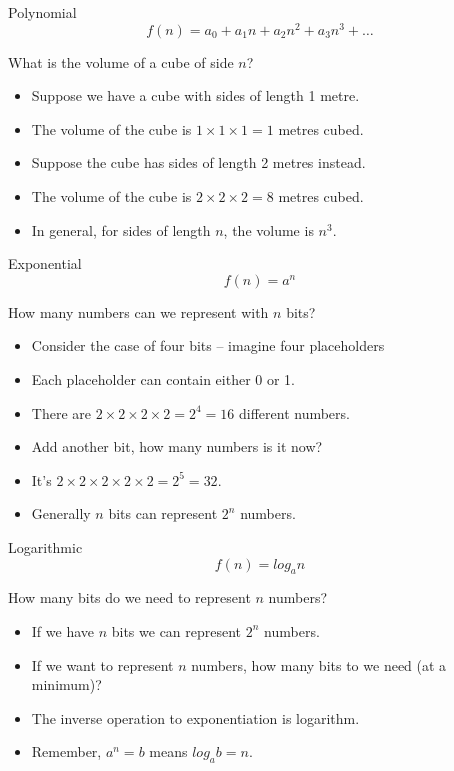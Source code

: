 \begin{frame}{Polynomial}
  \[ f(n) = a_0 + a_1 n + a_2 n^2 + a_3 n^3 + \ldots \]
  \begin{alertblock}{What is the volume of a cube of side $n$?}
    \begin{itemize}
      \item Suppose we have a cube with sides of length 1 metre.
      \item The volume of the cube is $1 \times 1 \times 1 = 1$ metres cubed.
      \item Suppose the cube has sides of length 2 metres instead.
      \item The volume of the cube is $2 \times 2 \times 2 = 8$ metres cubed.
      \item In general, for sides of length $n$, the volume is $n^3$.
    \end{itemize}
  \end{alertblock}
\end{frame}


\begin{frame}{Exponential}
  \[ f(n) = a^n \]
  \begin{alertblock}{How many numbers can we represent with $n$ bits?}
    \begin{itemize}
      \item Consider the case of four bits -- imagine four placeholders \textbf{}\textbf{}\textbf{}\textbf{}
      \item Each placeholder can contain either 0 or 1.
      \item There are $2 \times 2 \times 2 \times 2 = 2^4 = 16$ different numbers.
      \item Add another bit, how many numbers is it now?
      \item It's $2 \times 2 \times 2 \times 2 \times 2 = 2^5 = 32$.
      \item Generally $n$ bits can represent $2^n$ numbers.
    \end{itemize}
  \end{alertblock}
\end{frame}


\begin{frame}{Logarithmic}
  \[ f(n) = log_a n \]
  \begin{alertblock}{How many bits do we need to represent $n$ numbers?}
    \begin{itemize}
      \item If we have $n$ bits we can represent $2^n$ numbers.
      \item If we want to represent $n$ numbers, how many bits to we need (at a minimum)?
      \item The inverse operation to exponentiation is logarithm.
      \item Remember, $a^n = b$ means $log_a b = n$.
    \end{itemize}
  \end{alertblock}
\end{frame}

